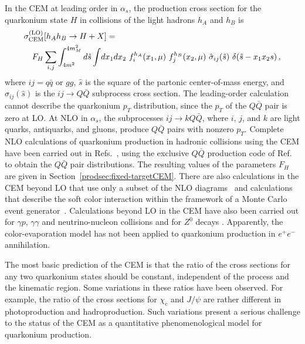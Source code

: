 In the CEM at leading order in $\alpha_s$, the production cross section 
for the quarkonium state $H$ in collisions of the light hadrons 
$h_A$ and $h_B$ is
%
\begin{eqnarray}
\lefteqn{\sigma_{\rm CEM}^{\rm (LO)}[h_A h_B \to H + X]  =} \nonumber\\
&& F_H \sum_{i,j} 
\int_{4m^2}^{4m_M^2} d\hat{s}
\int \! dx_1 dx_2~f_i^{h_A}(x_1,\mu)~f_j^{h_B}(x_2,\mu)~ 
\hat\sigma_{ij}(\hat{s})~\delta(\hat{s} - x_1x_2s)  \, , 
\label{prod:sigtil}
\end{eqnarray} 
%
where $ij = q \bar q$ or $g g$, $\hat s$ is the square of the partonic
center-of-mass energy, and $\hat\sigma_{ij}(\hat s)$ is the
$ij\rightarrow Q\bar Q$ subprocess cross section. The leading-order
calculation cannot describe the quarkonium $p_T$ distribution, since
the $p_T$ of the $Q \bar Q$ pair is zero at LO. At NLO in $\alpha_s$,
the subprocesses $ij\rightarrow k Q \bar Q$, where $i$, $j$, and $k$
are light quarks, antiquarks, and gluons, produce $Q \bar Q$ pairs
with nonzero $p_T$. Complete NLO calculations of quarkonium production
in hadronic collisions using the CEM have been carried out in
Refs.~\cite{Gavai:1994in,Schuler:1996ku}, using the exclusive $Q \bar
Q$ production code of Ref.~\cite{Mangano:kq} to obtain the $Q \bar Q$
pair distributions. The resulting values of the 
parameters $F_H$ are given 
in Section~\ref{prodsec:fixed-targetCEM}. There are also
calculations in the CEM beyond LO that use only a subset of the NLO
diagrams~\cite{Amundson:1996qr} and calculations that describe the
soft color interaction within the framework of a Monte Carlo event
generator~\cite{Edin:1997zb}. Calculations beyond LO in the CEM have
also been carried out for $\gamma p$, $\gamma\gamma$ and
neutrino-nucleon collisions and for $Z^0$ decays
\cite{Eboli:1998xx,Eboli:2003fr,Eboli:2003qg,Eboli:2001hc,Gregores:1996ek}.  
Apparently, the color-evaporation model has not been applied to
quarkonium production in $e^+ e^-$ annihilation.

The most basic prediction of the CEM is that the ratio of the cross
sections for any two quarkonium states should be constant, independent
of the process and the kinematic region. Some variations in these ratios
have been observed. For example, the ratio of the cross sections for
$\chi_c$ and $J/\psi$ are rather different in photoproduction and
hadroproduction. Such variations present a serious challenge to the
status of the CEM as a quantitative phenomenological model for
quarkonium production.

